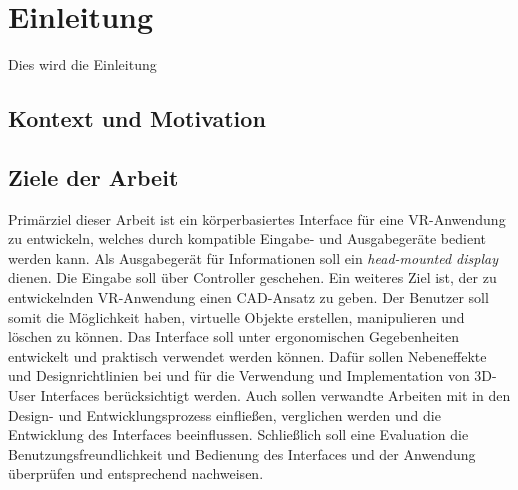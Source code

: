 \section{Einleitung}
Dies wird die Einleitung

\subsection{Kontext und Motivation}

\subsection{Ziele der Arbeit}
Primärziel dieser Arbeit ist ein körperbasiertes Interface für eine VR-Anwendung zu entwickeln, welches durch kompatible Eingabe- und Ausgabegeräte bedient werden kann. Als Ausgabegerät für Informationen  soll ein \textit{head-mounted display} dienen. Die Eingabe soll über Controller geschehen. Ein weiteres Ziel ist, der zu entwickelnden VR-Anwendung einen CAD-Ansatz zu geben. Der Benutzer soll somit die Möglichkeit haben, virtuelle Objekte erstellen, manipulieren und löschen zu können. Das Interface soll unter ergonomischen Gegebenheiten entwickelt und praktisch verwendet werden können. Dafür sollen Nebeneffekte und Designrichtlinien bei und für die Verwendung und Implementation von 3D-User Interfaces berücksichtigt werden. Auch sollen verwandte Arbeiten mit in den Design- und Entwicklungsprozess einfließen, verglichen werden und die Entwicklung des Interfaces beeinflussen. Schließlich soll eine Evaluation die Benutzungsfreundlichkeit und Bedienung des Interfaces und der Anwendung überprüfen und entsprechend nachweisen.